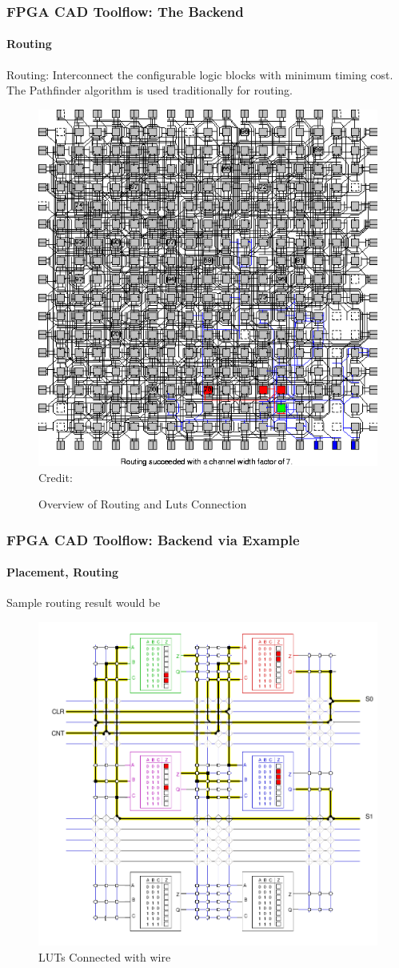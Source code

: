 \documentclass{beamer}
\begin{document}
{\begin{frame}[fragile]
  \frametitle{FPGA CAD Toolflow: The Backend}
  \framesubtitle{Routing}
  Routing: Interconnect the configurable logic blocks with minimum timing cost.
  The Pathfinder algorithm is used traditionally for routing.  
  \begin{figure}
    \centering
    \includegraphics[width=0.5\linewidth]{images/Routing_ove.png}
     \hspace*{1pt}\hbox{\scriptsize Credit:} 
    \caption{Overview of Routing and Luts Connection}
    \label{exa_interconnect}
  \end{figure}
\end{frame}

\begin{frame}[fragile]
  \frametitle{FPGA CAD Toolflow: Backend via Example}
  \framesubtitle{Placement, Routing}
  Sample routing result would be 
  \begin{figure}
    \centering
    \includegraphics[width=0.5\linewidth]{images/fpga_luts.png}
    \caption{LUTs Connected with wire\cite{brown92}}
    \label{exa_interconnect}
  \end{figure}
\end{frame}


}
\end{document}
